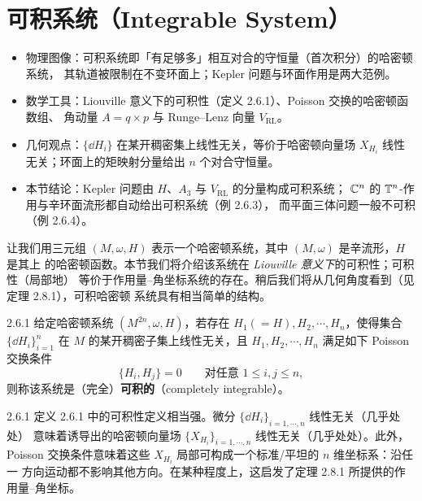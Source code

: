 \section{可积系统（Integrable System）}

\begin{keytakeaways}
\begin{itemize}
  \item 物理图像：可积系统即「有足够多」相互对合的守恒量（首次积分）的哈密顿系统，
        其轨道被限制在不变环面上；Kepler 问题与环面作用是两大范例。
  \item 数学工具：Liouville 意义下的可积性（定义 2.6.1）、Poisson 交换的哈密顿函数组、
        角动量 $A=q\times p$ 与 Runge--Lenz 向量 $V_{\mathrm{RL}}$。
  \item 几何观点：$\{\dd H_i\}$ 在某开稠密集上线性无关，等价于哈密顿向量场
        $X_{H_i}$ 线性无关；环面上的矩映射分量给出 $n$ 个对合守恒量。
  \item 本节结论：Kepler 问题由 $H$、$A_3$ 与 $V_{\mathrm{RL}}$ 的分量构成可积系统；
        $\mathbb{C}^n$ 的 $\mathbb{T}^n$-作用与辛环面流形都自动给出可积系统（例 2.6.3），
        而平面三体问题一般不可积（例 2.6.4）。
\end{itemize}
\end{keytakeaways}

让我们用三元组 $(M,\omega,H)$ 表示一个哈密顿系统，其中 $(M,\omega)$ 是辛流形，$H$ 是其上
的哈密顿函数。本节我们将介绍该系统在 \emph{Liouville 意义下}的可积性；可积性（局部地）
等价于作用量–角坐标系统的存在。稍后我们将从几何角度看到（见定理 2.8.1），可积哈密顿
系统具有相当简单的结构。

\begin{wdefn}{2.6.1}
给定哈密顿系统 $(M^{2n},\omega,H)$，若存在 $H_1(=H),H_2,\cdots,H_n$，使得集合
$\{\dd H_i\}_{i=1}^n$ 在 $M$ 的某开稠密子集上线性无关，且 $H_1,H_2,\cdots,H_n$
满足如下 Poisson 交换条件
\[
  \{H_i,H_j\}=0\qquad\text{对任意 } 1\le i,j\le n,
\]
则称该系统是（完全）\textbf{可积的}（completely integrable）。
\end{wdefn}

\begin{wrem}{2.6.1}
定义 2.6.1 中的可积性定义相当强。微分 $\{\dd H_i\}_{i=1,\cdots,n}$ 线性无关（几乎处处）
意味着诱导出的哈密顿向量场 $\{X_{H_i}\}_{i=1,\cdots,n}$ 线性无关（几乎处处）。此外，
Poisson 交换条件意味着这些 $X_{H_i}$ 局部可构成一个标准/平坦的 $n$ 维坐标系：沿任一
方向运动都不影响其他方向。在某种程度上，这启发了定理 2.8.1 所提供的作用量–角坐标。
\end{wrem}

